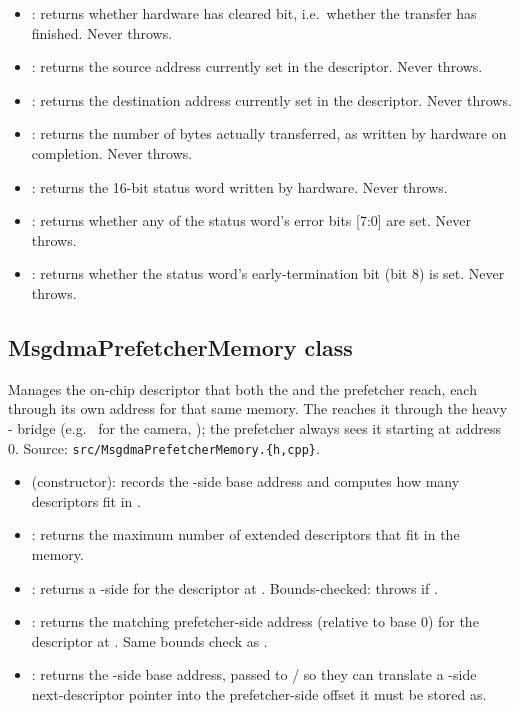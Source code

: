 \begin{itemize}
    \item {}: returns whether hardware has cleared  bit, i.e.\ whether the transfer has finished. Never throws.
    \item {}: returns the source address currently set in the descriptor. Never throws.
    \item {}: returns the destination address currently set in the descriptor. Never throws.
    \item {}: returns the number of bytes actually transferred, as written by hardware on completion. Never throws.
    \item {}: returns the 16-bit status word written by hardware. Never throws.
    \item {}: returns whether any of the status word's error bits [7:0] are set. Never throws.
    \item {}: returns whether the status word's early-termination bit (bit 8) is set. Never throws.
\end{itemize}

\subsection{MsgdmaPrefetcherMemory class}
\label{subsec:fpgasteel-msgdma-prefetcher-memory}

Manages the on-chip descriptor  that both the  and the prefetcher reach, each through its own address for that same memory. The  reaches it through the heavy - bridge (e.g.\  for the camera, ); the prefetcher always sees it starting at address 0. Source: \lstinline[style=inlineFsRepo]!src/MsgdmaPrefetcherMemory.{h,cpp}!.

\begin{itemize}
    \item {} (constructor): records the -side base address and computes how many descriptors fit in .
    \item {}: returns the maximum number of extended descriptors that fit in the memory.
    \item {}: returns a -side  for the descriptor at . Bounds-checked: throws  if .
    \item {}: returns the matching prefetcher-side address (relative to base 0) for the descriptor at . Same bounds check as .
    \item {}: returns the -side base address, passed to / so they can translate a -side next-descriptor pointer into the prefetcher-side offset it must be stored as.
\end{itemize}

